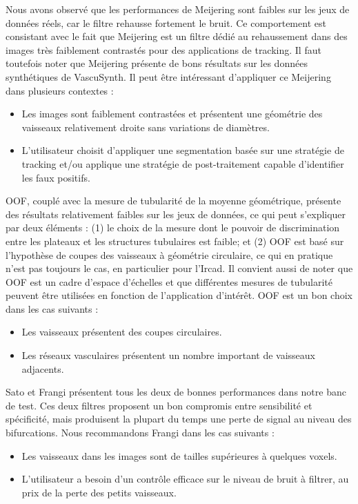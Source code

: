 Nous avons observé que les performances de Meijering sont faibles sur les jeux de données réels, car le filtre rehausse fortement le bruit. Ce comportement est consistant avec le fait que Meijering est un filtre dédié au rehaussement dans des images très faiblement contrastés pour des applications de tracking. Il faut toutefois noter que Meijering présente de bons résultats sur les données synthétiques de VascuSynth. Il peut être intéressant d’appliquer ce Meijering dans plusieurs contextes :

\begin{itemize}
  \item Les images sont faiblement contrastées et présentent une géométrie des vaisseaux relativement droite sans variations de diamètres.
  \item L'utilisateur choisit d'appliquer une segmentation basée sur une stratégie de tracking et/ou applique une stratégie de post-traitement capable d'identifier les faux positifs.
\end{itemize}

OOF, couplé avec la mesure de tubularité de la moyenne géométrique, présente des résultats relativement faibles sur les jeux de données, ce qui peut s'expliquer par deux éléments : (1) le choix de la mesure dont le pouvoir de discrimination entre les plateaux et les structures tubulaires est faible; et (2) OOF est basé sur l'hypothèse de coupes des vaisseaux à géométrie circulaire, ce qui en pratique n'est pas toujours le cas, en particulier pour l'Ircad. Il convient aussi de noter que OOF est un cadre d'espace d'échelles et que différentes mesures de tubularité peuvent être utilisées en fonction de l'application d'intérêt. OOF est un bon choix dans les cas suivants : 

\begin{itemize}
  \item Les vaisseaux présentent des coupes circulaires.
  \item Les réseaux vasculaires présentent un nombre important de vaisseaux adjacents.
\end{itemize}

Sato et Frangi présentent tous les deux de bonnes performances dans notre banc de test. Ces deux filtres proposent un bon compromis entre sensibilité et spécificité, mais produisent la plupart du temps une perte de signal au niveau des bifurcations. Nous recommandons Frangi dans les cas suivants :

\begin{itemize}
  \item Les vaisseaux dans les images sont de tailles supérieures à quelques voxels.
  \item L'utilisateur a besoin d'un contrôle efficace sur le niveau de bruit à filtrer, au prix de la perte des petits vaisseaux.
\end{itemize}

